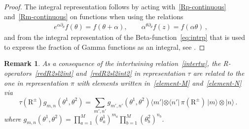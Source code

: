 \documentclass[11pt]{article}
\numberwithin{equation}{section}
\newtheorem{remark}[theorem]{Remark}
\newcommand{\M}{M}
\newcommand{\abrOSCR}{\mathrm{R}}
\newcommand{\hidden}{\theta}
\newcommand{\rep}{\tau}
\begin{document}
\begin{proof}
  		                 
The integral representation follows by acting with~\eqref{Rp-continuous} and~\eqref{Rm-continuous} on functions when using the relations
	\begin{equation}\label{shift-formulas}
		\begin{split}
			&e^{\alpha\partial_{\hidden}}f(\hidden)=f(\hidden+\alpha),\qquad \alpha^{\hidden\partial_{\hidden}}f(z)=f(\alpha \hidden)\,,
		\end{split}
	\end{equation}
	and from the integral representation of the Beta-function~\eqref{eq:intrp}
that is used to express the fraction of Gamma functions as an integral,
see \cite{Derkachov:1999pz}.
\end{proof}


\begin{remark}\label{InterRe}
As a consequence of the intertwining relation~\eqref{intertw},
 the R-operators~\eqref{redR2sl2int} and~\eqref{redR2sl2int2} in representation $\rep$  are related  to  the one in representation $\pi$ with elements written in~\eqref{element-M} and~\eqref{element-N} via
 \begin{equation}
  \rep (\abrOSCR ^\pm) g_{m,n}(\hidden^{1},\hidden^{2})=\sum_{m',n'} g_{m',n'}(\hidden^{1},\hidden^{2})\langle m'|\otimes \langle n'|\,\pi(\abrOSCR^\pm) \,|m\rangle \otimes |n\rangle\,.
 \end{equation}
where $g_{m,n}(\hidden^{1},\hidden^{2})=\prod_{a=1}^{\M}(\hidden_a^{1})^{m_a}\prod_{b=1}^{\M}(\hidden_{b}^{2})^{n_{b}}$.

 

\end{remark}
\end{document}
